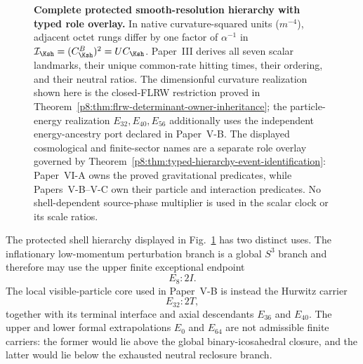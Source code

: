 \documentclass[12pt,a4paper]{article}
\begin{document}
\begin{figure}[h]
{%
}
\caption{\textbf{Complete protected smooth-resolution hierarchy with typed role overlay.}  In native curvature-squared units ($m^{-4}$), adjacent octet rungs differ by one factor of $\alpha^{-1}$ in $\mathcal I_{\Ksh}=(C^B_{\Ksh})^2=UC_{\Ksh}$.  Paper~III derives all seven scalar landmarks, their unique common-rate hitting times, their ordering, and their neutral ratios.  The dimensionful curvature realization shown here is the closed-FLRW restriction proved in Theorem~\ref{p8:thm:flrw-determinant-owner-inheritance}; the particle-energy realization $E_{32},E_{40},E_{56}$ additionally uses the independent energy-ancestry port declared in Paper~V-B.  The displayed cosmological and finite-sector names are a separate role overlay governed by Theorem~\ref{p8:thm:typed-hierarchy-event-identification}: Paper~VI-A owns the proved gravitational predicates, while Papers~V-B--V-C own their particle and interaction predicates.  No shell-dependent source-phase multiplier is used in the scalar clock or its scale ratios.}
\label{p8:fig:hierarchy_corrected}
\end{figure}

\begin{proposition}
\label{p8:prop:global-2I-local-particle-core}
The protected shell hierarchy displayed in Fig.~\ref{p8:fig:hierarchy_corrected}
has two distinct uses.  The inflationary low-momentum perturbation branch is a global
\(S^3\) branch and therefore may use the upper finite exceptional
endpoint
\[
    E_8:2I.
\]
The local visible-particle core used in Paper~V-B is instead the Hurwitz carrier
\[
    E_{32}:2T,
\]
together with its terminal interface and axial descendants \(E_{36}\) and
\(E_{40}\).  The upper and lower formal extrapolations \(E_0\) and \(E_{64}\)
are not admissible finite carriers: the former would lie above the global
binary-icosahedral closure, and the latter would lie below the exhausted neutral
reclosure branch.
\end{proposition}
\end{document}
